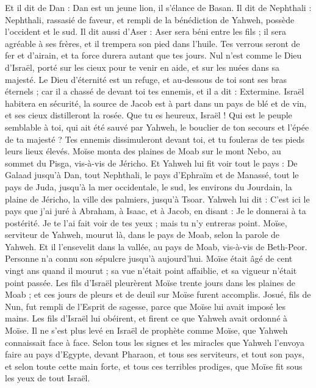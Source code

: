 \begin{multicols}{2}
Et il dit de Dan : Dan est un jeune lion, il s’élance de Basan.
Il dit de Nephthali : Nephthali, rassasié de faveur, et rempli de la bénédiction de Yahweh, possède l'occident et le sud.
Il dit aussi d'Aser : Aser sera béni entre les fils ; il sera agréable à ses frères, et il trempera son pied dans l'huile.
Tes verrous seront de fer et d'airain, et ta force durera autant que tes jours.
Nul n’est comme le Dieu d’Israël, porté sur les cieux pour te venir en aide, et sur les nuées dans sa majesté.
Le Dieu d’éternité est un refuge, et au-dessous de toi sont ses bras éternels ; car il a chassé de devant toi tes ennemis, et il a dit : Extermine.
Israël habitera en sécurité, la source de Jacob est à part dans un pays de blé et de vin, et ses cieux distilleront la rosée.
Que tu es heureux, Israël ! Qui est le peuple semblable à toi, qui ait été sauvé par Yahweh, le bouclier de ton secours et l'épée de ta majesté ? Tes ennemis dissimuleront devant toi, et tu fouleras de tes pieds leurs lieux élevés.
\VerseOne{}Moïse monta des plaines de Moab sur le mont Nebo, au sommet du Pisga, vis-à-vis de Jéricho. Et Yahweh lui fit voir tout le pays : De Galaad jusqu’à Dan,
tout Nephthali, le pays d'Ephraïm et de Manassé, tout le pays de Juda, jusqu'à la mer occidentale,
le sud, les environs du Jourdain, la plaine de Jéricho, la ville des palmiers, jusqu'à Tsoar.
Yahweh lui dit : C'est ici le pays que j'ai juré à Abraham, à Isaac, et à Jacob, en disant : Je le donnerai à ta postérité. Je te l'ai fait voir de tes yeux ; mais tu n'y entreras point.
Moïse, serviteur de Yahweh, mourut là, dans le pays de Moab, selon la parole de Yahweh.
Et il l'ensevelit dans la vallée, au pays de Moab, vis-à-vis de Beth-Peor. Personne n'a connu son sépulcre jusqu'à aujourd'hui.
Moïse était âgé de cent vingt ans quand il mourut ; sa vue n'était point affaiblie, et sa vigueur n'était point passée.
Les fils d'Israël pleurèrent Moïse trente jours dans les plaines de Moab ; et ces jours de pleurs et de deuil sur Moïse furent accomplis.
Josué, fils de Nun, fut rempli de l'Esprit de sagesse, parce que Moïse lui avait imposé les mains. Les fils d'Israël lui obéirent, et firent ce que Yahweh avait ordonné à Moïse.
Il ne s'est plus levé en Israël de prophète comme Moïse, que Yahweh connaissait face à face.
Selon tous les signes et les miracles que Yahweh l'envoya faire au pays d'Egypte, devant Pharaon, et tous ses serviteurs, et tout son pays,
et selon toute cette main forte, et tous ces terribles prodiges, que Moïse fit sous les yeux de tout Israël.
\PPE{}
\end{multicols}
